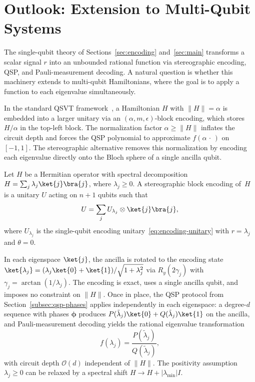 \section{Outlook: Extension to Multi-Qubit Systems}
\label{sec:block-encoding}

The single-qubit theory of Sections~\ref{sec:encoding}
and~\ref{sec:main} transforms a scalar signal $r$ into an
unbounded rational function via stereographic encoding, QSP,
and Pauli-measurement decoding.  A natural question is whether
this machinery extends to multi-qubit Hamiltonians, where the
goal is to apply a function to each eigenvalue simultaneously.

In the standard QSVT framework~\cite{GSLW2019}, a Hamiltonian
$H$ with $\|H\| = \alpha$ is embedded into a larger unitary via
an $(\alpha, m, \epsilon)$-block encoding, which stores
$H/\alpha$ in the top-left block.  The normalization factor
$\alpha \geq \|H\|$ inflates the circuit depth and forces the
QSP polynomial to approximate $f(\alpha\,\cdot\,)$ on $[-1,1]$.
The stereographic alternative removes this normalization by
encoding each eigenvalue directly onto the Bloch sphere of a
single ancilla qubit.

\begin{definition}
	\label{def:stereo-block}
	Let $H$ be a Hermitian operator with spectral decomposition
	$H = \sum_j \lambda_j \ket{j}\bra{j}$, where
	$\lambda_j \geq 0$.  A stereographic block encoding of~$H$
	is a unitary $U$ acting on $n + 1$ qubits such that
	\begin{equation}
		U = \sum_j U_{\lambda_j} \otimes \ket{j}\bra{j},
		\label{eq:stereo-block}
	\end{equation}
	where $U_{\lambda_j}$ is the single-qubit encoding
	unitary~\eqref{eq:encoding-unitary} with $r = \lambda_j$
	and $\theta = 0$.
\end{definition}

In each eigenspace $\ket{j}$, the ancilla is rotated to the
encoding state
$\ket{\lambda_j} = (\lambda_j\ket{0} +
	\ket{1})/\sqrt{1+\lambda_j^2}$
via $R_y(2\gamma_j)$ with $\gamma_j = \arctan(1/\lambda_j)$.
The encoding is exact, uses a single ancilla qubit, and imposes
no constraint on $\|H\|$.  Once in place, the QSP protocol from
Section~\ref{subsec:qsp-phases} applies independently in each
eigenspace: a degree-$d$ sequence with phases $\bm{\phi}$
produces
$P(\tilde{\lambda}_j)\ket{0} +
	Q(\tilde{\lambda}_j)\ket{1}$
on the ancilla, and Pauli-measurement decoding yields the
rational eigenvalue transformation
\begin{equation}
	f(\lambda_j) = \frac{P(\tilde{\lambda}_j)}{Q(\tilde{\lambda}_j)},
	\label{eq:eigenvalue-transform}
\end{equation}
with circuit depth $\mathcal{O}(d)$ independent of $\|H\|$.
The positivity assumption $\lambda_j \geq 0$ can be relaxed by
a spectral shift $H \to H + |\lambda_{\min}|I$.

